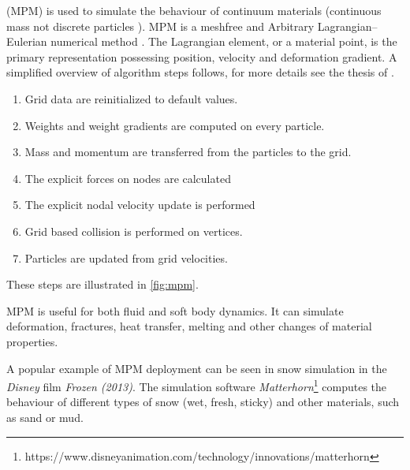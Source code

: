  (MPM) is used to simulate the behaviour of continuum materials (continuous mass not discrete particles ). MPM is a meshfree and Arbitrary Lagrangian–Eulerian numerical method \cite{ALE}. The Lagrangian element, or a material point, is the primary representation  possessing position, velocity and deformation gradient. A simplified overview of algorithm steps follows, for more details see the thesis of \citet{jiang2015material}.

\begin{enumerate}
    \item Grid data are reinitialized to default values.
    \item Weights and weight gradients are computed on every particle.
    \item Mass and momentum are transferred from the particles to the grid.
    \item The explicit forces on nodes are calculated
    \item The explicit nodal velocity update is performed
    \item Grid based collision is performed on vertices.
    \item Particles are updated from grid velocities.
\end{enumerate}
These steps are illustrated in \cref{fig:mpm}.

MPM is useful for both fluid and soft body dynamics. It can simulate deformation, fractures, heat transfer, melting and other changes of material properties.

A popular example of MPM deployment can be seen in snow simulation in the \emph{Disney} film \emph{Frozen (2013)}. The simulation software \emph{Matterhorn}\footnote{https://www.disneyanimation.com/technology/innovations/matterhorn} computes the behaviour of different types of snow (\eg wet, fresh, sticky) and other materials, such as sand or mud.

